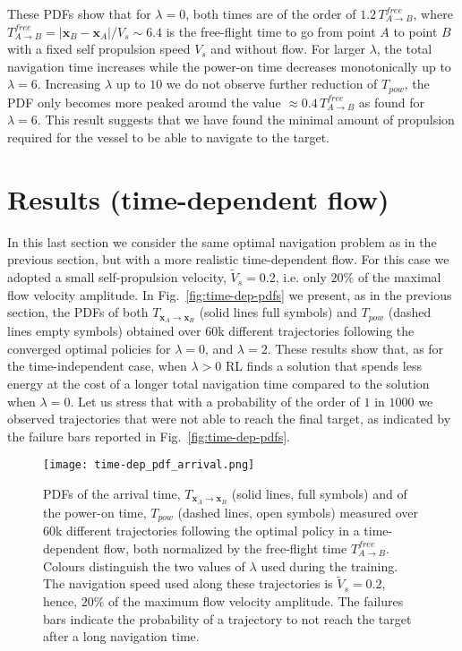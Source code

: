 \documentclass[
]{ceurart}
\newcommand{\ve}[1]{\ensuremath{\boldsymbol{#1}}}
\begin{document}
{\begin{figure}
\label{fig:pdf-time}
\end{figure}
These PDFs show that for $\lambda=0$, both times are of the order of $1.2 \, T_{A \rightarrow B}^{free}$, where $T_{A \rightarrow B}^{free} = |{\ve x}_B-{\ve x}_A|/V_s \sim 6.4$ is the free-flight time to go from point $A$ to point $B$ with a fixed self propulsion speed $V_s$ and without flow. For larger $\lambda$, the total navigation time increases while the power-on time decreases monotonically up to $\lambda=6$. Increasing $\lambda$ up to $10$ we do not observe further reduction of $T_{pow}$, the PDF only becomes more peaked around the value $\approx 0.4 \, T_{A \rightarrow B}^{free}$ as found for $\lambda=6$. This result suggests that we have found the minimal amount of propulsion required for the vessel to be able to navigate to the target. 
\section{Results (time-dependent flow)}
In this last section we consider the same optimal navigation problem as in the previous section, but with a more realistic time-dependent flow. For this case we adopted a small self-propulsion velocity, $\tilde{V}_s=0.2$, i.e. only $20\%$ of the maximal flow velocity amplitude. 
In Fig.~\ref{fig:time-dep-pdfs} we present, as in the previous section, the PDFs of both $T_{{\ve x}_{A} \rightarrow {\ve x}_{B}}$ (solid lines full symbols) and $T_{pow}$ (dashed lines empty symbols) obtained over 60k different trajectories following the converged optimal policies for $\lambda=0$, and $\lambda=2$. These results show that, as for the time-independent case, when $\lambda>0$ RL finds a solution that spends less energy at the cost of a longer total navigation time compared to the solution when $\lambda=0$.
Let us stress that with a probability of the order of $1$ in $1000$ we observed trajectories that were not able to reach the final target, as indicated by the failure bars reported in Fig.~\ref{fig:time-dep-pdfs}.
\begin{figure}
\centering
\texttt{[image: time-dep\_pdf\_arrival.png]}
\caption{PDFs of the arrival time, $T_{{\ve x}_{A} \rightarrow {\ve x}_{B}}$ (solid lines, full symbols) and of the power-on time, $T_{pow}$ (dashed lines, open symbols) measured over 60k different trajectories following the optimal policy in a time-dependent flow, both normalized by the free-flight time $T_{A \rightarrow B}^{free}$. Colours distinguish the two values of $\lambda$ used during the training. The navigation speed used along these trajectories is $\tilde{V}_s=0.2$, hence, $20\%$ of the maximum flow velocity amplitude. The failures bars indicate the probability of a trajectory to not reach the target after a long navigation time.}

\end{figure}}
\end{document}
